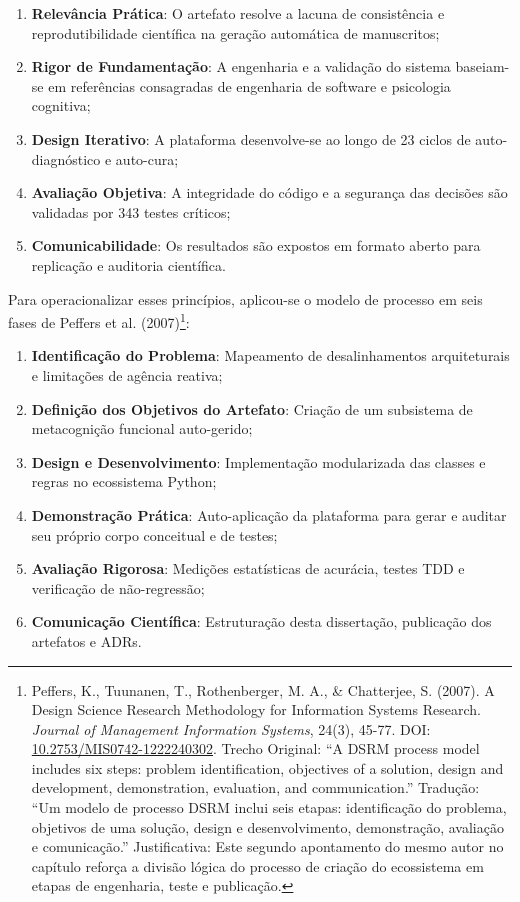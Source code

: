\documentclass[12pt,a4paper,oneside]{abntex2}
\begin{document}
\begin{enumerate}
    \item \textbf{Relevância Prática}: O artefato resolve a lacuna de consistência e reprodutibilidade científica na geração automática de manuscritos;
    \item \textbf{Rigor de Fundamentação}: A engenharia e a validação do sistema baseiam-se em referências consagradas de engenharia de software e psicologia cognitiva;
    \item \textbf{Design Iterativo}: A plataforma desenvolve-se ao longo de 23 ciclos de auto-diagnóstico e auto-cura;
    \item \textbf{Avaliação Objetiva}: A integridade do código e a segurança das decisões são validadas por 343 testes críticos;
    \item \textbf{Comunicabilidade}: Os resultados são expostos em formato aberto para replicação e auditoria científica.
\end{enumerate}

Para operacionalizar esses princípios, aplicou-se o modelo de processo em seis fases de Peffers et al. (2007)\footnote{Peffers, K., Tuunanen, T., Rothenberger, M. A., \& Chatterjee, S. (2007). A Design Science Research Methodology for Information Systems Research. \textit{Journal of Management Information Systems}, 24(3), 45-77. DOI: \href{https://doi.org/10.2753/MIS0742-1222240302}{10.2753/MIS0742-1222240302}. Trecho Original: ``A DSRM process model includes six steps: problem identification, objectives of a solution, design and development, demonstration, evaluation, and communication.'' Tradução: ``Um modelo de processo DSRM inclui seis etapas: identificação do problema, objetivos de uma solução, design e desenvolvimento, demonstração, avaliação e comunicação.'' Justificativa: Este segundo apontamento do mesmo autor no capítulo reforça a divisão lógica do processo de criação do ecossistema em etapas de engenharia, teste e publicação.}:

\begin{enumerate}
    \item \textbf{Identificação do Problema}: Mapeamento de desalinhamentos arquiteturais e limitações de agência reativa;
    \item \textbf{Definição dos Objetivos do Artefato}: Criação de um subsistema de metacognição funcional auto-gerido;
    \item \textbf{Design e Desenvolvimento}: Implementação modularizada das classes e regras no ecossistema Python;
    \item \textbf{Demonstração Prática}: Auto-aplicação da plataforma para gerar e auditar seu próprio corpo conceitual e de testes;
    \item \textbf{Avaliação Rigorosa}: Medições estatísticas de acurácia, testes TDD e verificação de não-regressão;
    \item \textbf{Comunicação Científica}: Estruturação desta dissertação, publicação dos artefatos e ADRs.
\end{enumerate}
\end{document}

